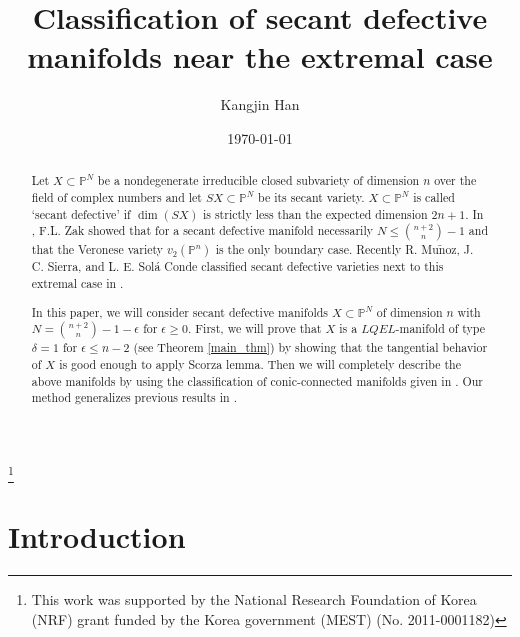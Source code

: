 \documentclass[11pt]{amsart}
\def\P{{\mathbb P}}
\theoremstyle{theorem} %
\theoremstyle{definition}
\numberwithin{equation}{section}
\begin{document}
\title[Classification of secant defective manifolds]{Classification of secant defective manifolds near the extremal case}
\author[K.\ Han]{Kangjin Han}
\address{Algebraic Structure and its Applications Research Center (ASARC), Department of Mathematics, Korea Advanced Institute of Science and Technology,
373-1 Gusung-dong, Yusung-Gu, Daejeon, Korea}

\thanks{This work was supported by the National Research Foundation of Korea (NRF) grant funded by the Korea
government (MEST) (No. 2011-0001182)}
\date{\today}

\begin{abstract}
Let $X\subset \P^N$ be a nondegenerate irreducible closed subvariety of dimension $n$ over the field of complex numbers and let $SX\subset\P^N$ be its secant variety. $X\subset\P^N$ is called `secant defective' if $\dim(SX)$ is strictly less than the expected dimension $2n+1$. In \cite{Z1}, F.L. Zak showed that for a secant defective manifold necessarily $N\le{n+2 \choose n}-1$ and that the Veronese variety $v_2(\P^n)$ is the only boundary case. Recently R. Mu$\tilde{\textrm{n}}$oz, J. C. Sierra, and L. E. Sol\'a Conde classified secant defective varieties next to this extremal case in \cite{MSS}.


In this paper, we will consider secant defective manifolds $X\subset\P^N$ of dimension $n$ with $N={n+2 \choose n}-1-\epsilon$ for $\epsilon\ge0$. First, we will prove that $X$ is a $LQEL$-manifold of type $\delta=1$ for $\epsilon\le n-2$ (see Theorem \ref{main_thm}) by showing that the tangential behavior of $X$ is good enough to apply Scorza lemma. Then we will completely describe the above manifolds by using the classification of conic-connected manifolds given in \cite{IR1}. Our method generalizes previous results in \cite{Z1,MSS}.
\end{abstract}


\maketitle
\setcounter{page}{1}

\section*{Introduction}\label{section_0}
\end{document}
